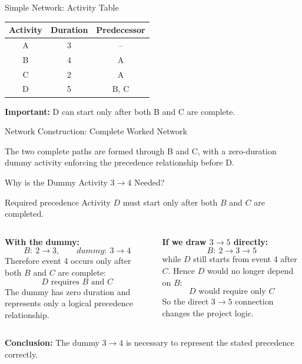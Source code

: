 \documentclass[aspectratio=169,10pt]{beamer}
\begin{document}
\begin{frame}{Simple Network: Activity Table}
\centering
\begin{tabular}{c|c|c}
\toprule
Activity & Duration & Predecessor\\
\midrule
A & 3 & --\\
B & 4 & A\\
C & 2 & A\\
D & 5 & B, C\\
\bottomrule
\end{tabular}
\vspace{0.35cm}

\textbf{Important:} D can start only after both B and C are complete.
\end{frame}

\begin{frame}{Network Construction: Complete Worked Network}
\centering
{}
\vspace{0.2cm}

The two complete paths are formed through B and C, with a zero-duration dummy activity enforcing the precedence relationship before D.
\end{frame}

\begin{frame}{Why is the Dummy Activity $3\rightarrow4$ Needed?}
\small
\begin{block}{Required precedence}
Activity $D$ must start only after both $B$ and $C$ are completed.
\end{block}

\begin{columns}[T,totalwidth=\textwidth]
\textbf{With the dummy:}
\[
B:~2\rightarrow3,\qquad dummy:~3\rightarrow4
\]
Therefore event 4 occurs only after both $B$ and $C$ are complete:
\[
\boxed{D\text{ requires }B\text{ and }C}
\]
The dummy has zero duration and represents only a logical precedence relationship.

\textbf{If we draw $3\rightarrow5$ directly:}
\[
B:~2\rightarrow3\rightarrow5
\]
while $D$ still starts from event 4 after $C$. Hence $D$ would no longer depend on $B$:
\[
\boxed{D\text{ would require only }C}
\]
So the direct $3\rightarrow5$ connection changes the project logic.
\end{columns}

\vspace{0.18cm}
\centering
\textbf{Conclusion:} The dummy $3\rightarrow4$ is necessary to represent the stated precedence correctly.
\end{frame}
\end{document}
